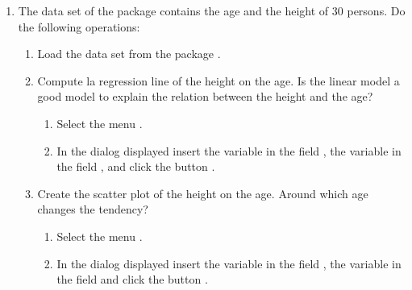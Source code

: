 \begin{enumerate}[leftmargin=*]
\item The data set  of the package  contains the age and the height of 30
persons.
Do the following operations:
\begin{enumerate}
\item Load the data set  from the package .

\item Compute la regression line of the height on the age.
Is the linear model a good model to explain the relation between the height and the age?
\begin{indication}
\begin{enumerate}
\item Select the menu .
\item In the dialog displayed insert the variable  in the field , the
variable  in the field , and click the button .
\end{enumerate}
\end{indication}

\item Create the scatter plot of the height on the age. 
Around which age changes the tendency?
\begin{indication}
\begin{enumerate}
\item Select the menu .
\item In the dialog displayed insert the variable  in the field ,
the variable  in the field  and click the button .
\end{enumerate}
\end{indication}


\end{enumerate}
\end{enumerate}

